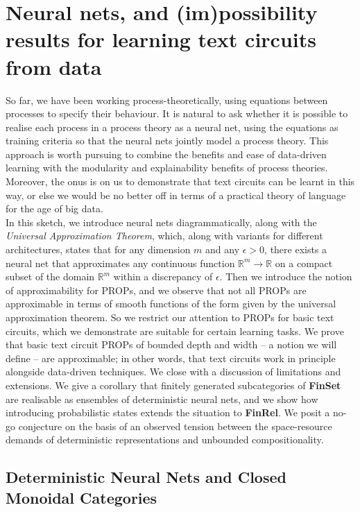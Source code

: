 \section{Neural nets, and (im)possibility results for learning text circuits from data}

So far, we have been working process-theoretically, using equations between processes to specify their behaviour. It is natural to ask whether it is possible to realise each process in a process theory as a neural net, using the equations as training criteria so that the neural nets jointly model a process theory. This approach is worth pursuing to combine the benefits and ease of data-driven learning with the modularity and explainability benefits of process theories. Moreover, the onus is on us to demonstrate that text circuits can be learnt in this way, or else we would be no better off in terms of a practical theory of language for the age of big data.\\

In this sketch, we introduce neural nets diagrammatically, along with the \emph{Universal Approximation Theorem}, which, along with variants for different architectures, states that for any dimension $m$ and any $\epsilon > 0$, there exists a neural net that approximates any continuous function $\mathbb{R}^m \rightarrow \mathbb{R}$ on a compact subset of the domain $\mathbb{R}^m$ within a discrepancy of $\epsilon$. Then we introduce the notion of approximability for PROPs, and we observe that not all PROPs are approximable in terms of smooth functions of the form given by the universal approximation theorem. So we restrict our attention to PROPs for basic text circuits, which we demonstrate are suitable for certain learning tasks. We prove that basic text circuit PROPs of bounded depth and width -- a notion we will define -- are approximable; in other words, that text circuits work in principle alongside data-driven techniques. We close with a discussion of limitations and extensions. We give a corollary that finitely generated subcategories of \textbf{FinSet} are realisable as ensembles of deterministic neural nets, and we show how introducing probabilistic states extends the situation to \textbf{FinRel}. We posit a no-go conjecture on the basis of an observed tension between the space-resource demands of deterministic representations and unbounded compositionality.

\subsection{Deterministic Neural Nets and Closed Monoidal Categories}

